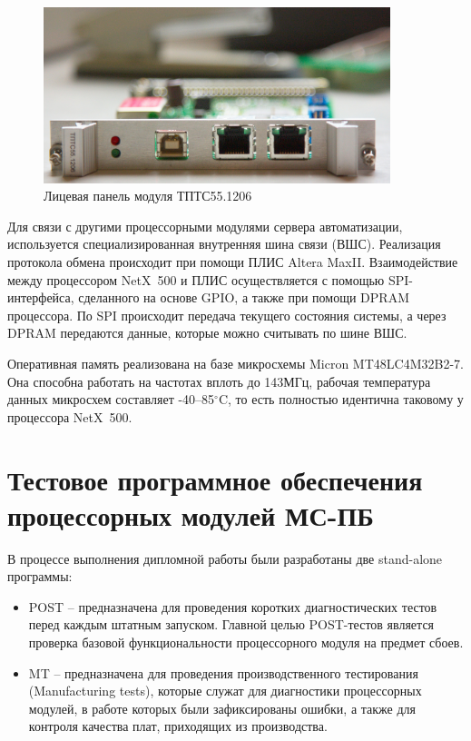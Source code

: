 \documentclass[a4paper,14pt,bachelor]{disser}
\begin{document}
\begin{figure}[H] %
 \begin{center}
 \includegraphics[width=0.9\textwidth]{tpts_1206}
 \caption{\label{tpts_1206} Лицевая панель модуля ТПТС55.1206}
 \end{center}
\end{figure}


Для связи с другими процессорными модулями сервера автоматизации, используется специализированная внутренняя шина связи (ВШС). Реализация протокола обмена происходит при помощи ПЛИС Altera MaxII. Взаимодействие между процессором NetX~500 и ПЛИС осуществляется с помощью SPI-интерфейса, сделанного на основе GPIO, а также при помощи DPRAM процессора. По SPI происходит передача текущего состояния системы, а через DPRAM передаются данные, которые можно считывать по шине ВШС.

Оперативная память реализована на базе микросхемы Micron MT48LC4M32B2-7. Она способна работать на частотах вплоть до 143МГц, рабочая температура данных микросхем составляет -40--85$^\circ$C, то есть полностью идентична таковому у процессора NetX~500.

\chapter{Тестовое программное обеспечения процессорных модулей МС-ПБ}
В процессе выполнения дипломной работы были разработаны две stand-alone программы:
\begin{itemize}
 \item POST -- предназначена для проведения коротких диагностических тестов перед каждым штатным запуском. Главной целью POST-тестов является проверка базовой функциональности процессорного модуля на предмет сбоев.
 \item MT -- предназначена для проведения производственного тестирования (Manufacturing tests), которые служат для диагностики процессорных модулей, в работе которых были зафиксированы ошибки, а также для контроля качества плат, приходящих из производства.
\end{itemize}
\end{document}

